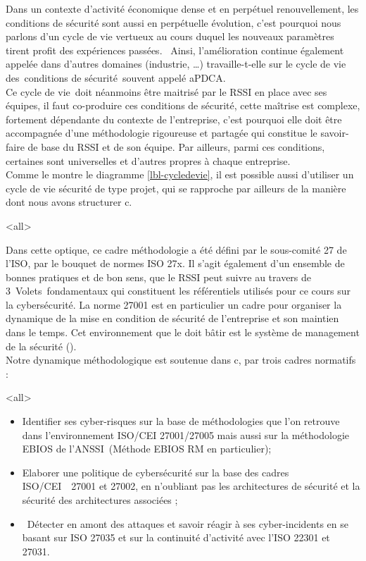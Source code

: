 Dans un contexte d'activité économique dense et en perpétuel renouvellement, les conditions de sécurité sont aussi en perpétuelle évolution, c’est pourquoi nous parlons d'un cycle de vie vertueux au cours duquel les nouveaux paramètres tirent profit des expériences passées.  Ainsi, l’amélioration continue également appelée  dans d’autres domaines (industrie, …) travaille-t-elle sur le cycle de vie des conditions de sécurité souvent appelé \gls{aPDCA}.\\
Ce cycle de vie doit néanmoins être maitrisé par le RSSI en place avec ses équipes, il faut co-produire ces conditions de sécurité, cette maîtrise est complexe, fortement dépendante du contexte de l'entreprise, c’est pourquoi elle doit être accompagnée d'une méthodologie rigoureuse et partagée qui constitue le savoir-faire de base du RSSI et de son équipe. Par ailleurs, parmi ces conditions, certaines sont universelles et d’autres propres à chaque entreprise. \\ Comme le montre le diagramme \ref{lbl-cycledevie}, il est possible aussi d’utiliser un cycle de vie sécurité de type projet, qui se rapproche par ailleurs de la manière dont nous avons structurer c\edoc. 

\mode<all>{}


Dans cette optique, ce cadre méthodologie a été défini par le sous-comité 27 de l'ISO, par le bouquet de normes ISO 27x. Il s’agit également d'un ensemble de bonnes pratiques et de bon sens, que le RSSI peut suivre au travers de 3 Volets fondamentaux qui constituent les référentiels utilisés pour ce cours sur la cybersécurité. La norme 27001 est en particulier un cadre pour organiser la dynamique de la mise en condition de sécurité de l’entreprise et son maintien dans le temps. Cet environnement que le  doit bâtir est le système de management de la sécurité ().\\
Notre dynamique méthodologique est soutenue dans  c\edoc, par trois cadres normatifs : 
 
\mode<all>{
{
\begin{itemize}
\item Identifier ses cyber-risques sur la base de méthodologies que l’on retrouve dans l’environnement ISO/CEI 27001/27005 mais aussi sur la méthodologie EBIOS de l’ANSSI (Méthode EBIOS RM en particulier); 
\item Elaborer une politique de cybersécurité sur la base des cadres ISO/CEI  27001 et 27002, en n’oubliant pas les architectures de sécurité et la sécurité des architectures associées ; 
\item Détecter en amont des attaques et savoir réagir à ses cyber-incidents en se basant sur ISO 27035 et sur la continuité d’activité avec l’ISO 22301 et 27031.
\end{itemize}
}} %


